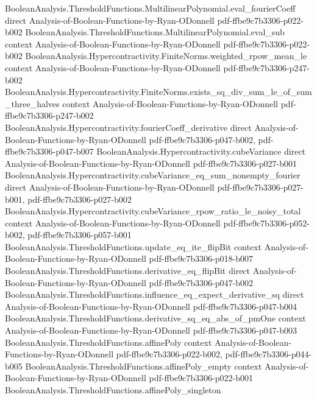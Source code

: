 \begin{theorem}
\proofstep
  {BooleanAnalysis.ThresholdFunctions.MultilinearPolynomial.eval_fourierCoeff}
  {direct}
  {Analysis-of-Boolean-Functions-by-Ryan-ODonnell}
  {pdf-ffbe9c7b3306-p022-b002}
\proofstep
  {BooleanAnalysis.ThresholdFunctions.MultilinearPolynomial.eval_sub}
  {context}
  {Analysis-of-Boolean-Functions-by-Ryan-ODonnell}
  {pdf-ffbe9c7b3306-p022-b002}
\proofstep
  {BooleanAnalysis.Hypercontractivity.FiniteNorms.weighted_rpow_mean_le}
  {context}
  {Analysis-of-Boolean-Functions-by-Ryan-ODonnell}
  {pdf-ffbe9c7b3306-p247-b002}
\proofstep
  {BooleanAnalysis.Hypercontractivity.FiniteNorms.exists_sq_div_sum_le_of_sum_three_halves}
  {context}
  {Analysis-of-Boolean-Functions-by-Ryan-ODonnell}
  {pdf-ffbe9c7b3306-p247-b002}
\proofstep
  {BooleanAnalysis.Hypercontractivity.fourierCoeff_derivative}
  {direct}
  {Analysis-of-Boolean-Functions-by-Ryan-ODonnell}
  {pdf-ffbe9c7b3306-p047-b002,
    pdf-ffbe9c7b3306-p047-b007}
\proofstep
  {BooleanAnalysis.Hypercontractivity.cubeVariance}
  {direct}
  {Analysis-of-Boolean-Functions-by-Ryan-ODonnell}
  {pdf-ffbe9c7b3306-p027-b001}
\proofstep
  {BooleanAnalysis.Hypercontractivity.cubeVariance_eq_sum_nonempty_fourier}
  {direct}
  {Analysis-of-Boolean-Functions-by-Ryan-ODonnell}
  {pdf-ffbe9c7b3306-p027-b001,
    pdf-ffbe9c7b3306-p027-b002}
\proofstep
  {BooleanAnalysis.Hypercontractivity.cubeVariance_rpow_ratio_le_noisy_total}
  {context}
  {Analysis-of-Boolean-Functions-by-Ryan-ODonnell}
  {pdf-ffbe9c7b3306-p052-b002,
    pdf-ffbe9c7b3306-p057-b001}
\proofstep
  {BooleanAnalysis.ThresholdFunctions.update_eq_ite_flipBit}
  {context}
  {Analysis-of-Boolean-Functions-by-Ryan-ODonnell}
  {pdf-ffbe9c7b3306-p018-b007}
\proofstep
  {BooleanAnalysis.ThresholdFunctions.derivative_eq_flipBit}
  {direct}
  {Analysis-of-Boolean-Functions-by-Ryan-ODonnell}
  {pdf-ffbe9c7b3306-p047-b002}
\proofstep
  {BooleanAnalysis.ThresholdFunctions.influence_eq_expect_derivative_sq}
  {direct}
  {Analysis-of-Boolean-Functions-by-Ryan-ODonnell}
  {pdf-ffbe9c7b3306-p047-b004}
\proofstep
  {BooleanAnalysis.ThresholdFunctions.derivative_sq_eq_abs_of_pmOne}
  {context}
  {Analysis-of-Boolean-Functions-by-Ryan-ODonnell}
  {pdf-ffbe9c7b3306-p047-b003}
\proofstep
  {BooleanAnalysis.ThresholdFunctions.affinePoly}
  {context}
  {Analysis-of-Boolean-Functions-by-Ryan-ODonnell}
  {pdf-ffbe9c7b3306-p022-b002,
    pdf-ffbe9c7b3306-p044-b005}
\proofstep
  {BooleanAnalysis.ThresholdFunctions.affinePoly_empty}
  {context}
  {Analysis-of-Boolean-Functions-by-Ryan-ODonnell}
  {pdf-ffbe9c7b3306-p022-b001}
\proofstep
  {BooleanAnalysis.ThresholdFunctions.affinePoly_singleton}

\end{theorem}
